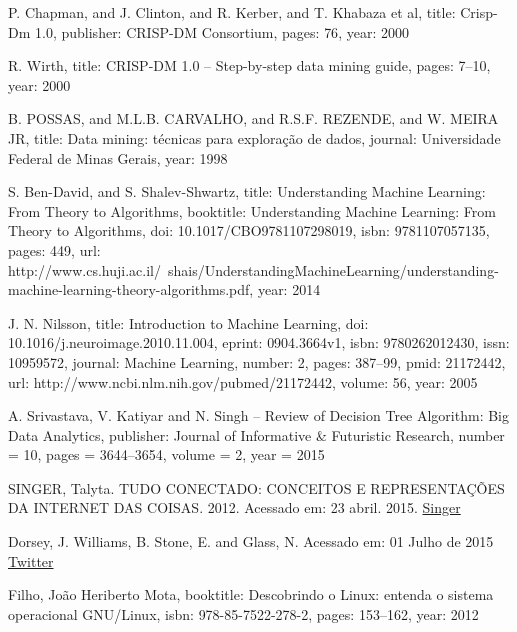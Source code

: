 \documentclass[conference,compsoc]{IEEEtran}
\begin{document}
\begin{thebibliography}{1}
  P. Chapman, and J. Clinton, and R. Kerber, and T. Khabaza et al,
  title: {Crisp-Dm 1.0},
  publisher: {CRISP-DM Consortium},
  pages: {76},
  year: {2000}

  R. Wirth,
  title: {CRISP-DM 1.0 – Step-by-step data mining guide},
  pages: {7--10},
  year: {2000}

  
  B. POSSAS, and M.L.B. CARVALHO, and R.S.F. REZENDE, and W. MEIRA JR,
  title: {Data mining: t{\'e}cnicas para explora{\c{c}}{\~a}o de dados},
  journal: {Universidade Federal de Minas Gerais},
  year: {1998}

  
  
  S. Ben-David, and S. Shalev-Shwartz,
  title: {Understanding Machine Learning: From Theory to Algorithms},
  booktitle: {Understanding Machine Learning: From Theory to Algorithms},
  doi: {10.1017/CBO9781107298019},
  isbn: {9781107057135},
  pages: {449},
  url: {http://www.cs.huji.ac.il/{~}shais/UnderstandingMachineLearning/understanding-machine-learning-theory-algorithms.pdf},
  year: {2014}

  

  J. N. Nilsson,
  title: {Introduction to Machine Learning},
  doi: {10.1016/j.neuroimage.2010.11.004},
  eprint: {0904.3664v1},
  isbn: {9780262012430},
  issn: {10959572},
  journal: {Machine Learning},
  number: {2},
  pages: {387--99},
  pmid: {21172442},
  url: {http://www.ncbi.nlm.nih.gov/pubmed/21172442},
  volume: {56},
  year: {2005}  
  

  A. Srivastava, V. Katiyar and N. Singh -- Review of Decision Tree Algorithm: Big Data Analytics,
  publisher: {Journal of Informative \& Futuristic Research},
  number = {10},
  pages = {3644--3654},
  volume = {2},
  year = {2015}
  
  
SINGER, Talyta. TUDO CONECTADO: CONCEITOS E REPRESENTAÇÕES DA INTERNET DAS COISAS. 2012.
Acessado em: 23 abril. 2015.
\href{http://www.simsocial2012.ufba.br/modulos/submissao/Upload/44965.pdf} {Singer}

Dorsey, J. Williams, B. Stone, E. and Glass, N.
Acessado em: 01 Julho de 2015
\href {https://pt.wikipedia.org/wiki/Twitter}
{Twitter}

  Filho, João Heriberto Mota,
  booktitle: {Descobrindo o Linux: entenda o sistema operacional GNU/Linux},
  isbn: {978-85-7522-278-2},
  pages: {153--162},
  year: {2012}





\end{thebibliography}
\end{document}
